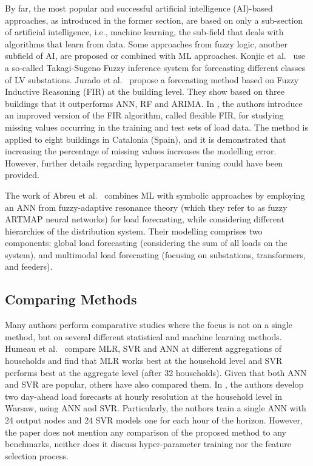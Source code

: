 By far, the most popular and successful artificial intelligence (AI)-based approaches, as introduced in the former section, are based on only a sub-section of artificial intelligence, i.e., machine learning, the sub-field that deals with algorithms that learn from data. Some approaches from fuzzy logic, another subfield of AI, are proposed or combined with ML approaches. Konjic et al.~\cite{konjic2005fis} use a so-called Takagi-Sugeno Fuzzy inference system for forecasting different classes of LV substations. Jurado et al.~\cite{Jurado2015hme} propose a forecasting method based on Fuzzy Inductive Reasoning (FIR) at the building level. They show based on three buildings that it outperforms ANN, RF and ARIMA. In \cite{jurado2017fir}, the authors introduce an improved version of the FIR algorithm, called flexible FIR, for studying missing values occurring in the training and test sets of load data. The method is applied to eight buildings in Catalonia (Spain), and it is demonstrated that increasing the percentage of missing values increases the modelling error. However, further details regarding hyperparameter tuning could have been provided. 

The work of Abreu et al.~\cite{Abreu2018mlf} combines ML with symbolic approaches by employing an ANN from fuzzy-adaptive resonance theory (which they refer to as fuzzy ARTMAP neural networks) for load forecasting, while considering different hierarchies of the distribution system. Their modelling comprises two components: global load forecasting (considering the sum of all loads on the system), and multimodal load forecasting (focusing on substations, transformers, and feeders).


\subsection{Comparing Methods} 
\label{sec:comparing_methods}

Many authors perform comparative studies where the focus is not on a single method, but on several different statistical and machine learning methods. Humeau et al.~\cite{Humeau2013elf} compare MLR, SVR and ANN at different aggregations of households and find that MLR works best at the household level and SVR performs best at the aggregate level (after 32 households). Given that both ANN and SVR are popular, others have also compared them. In \cite{gajowniczek2014ste}, the authors develop two day-ahead load forecasts at hourly resolution at the household level in Warsaw, using ANN and SVR. Particularly, the authors train a single ANN with 24 output nodes and 24 SVR models one for each hour of the horizon. However, the paper does not mention any comparison of the proposed method to any benchmarks, neither does it discuss hyper-parameter training nor the feature selection process.

